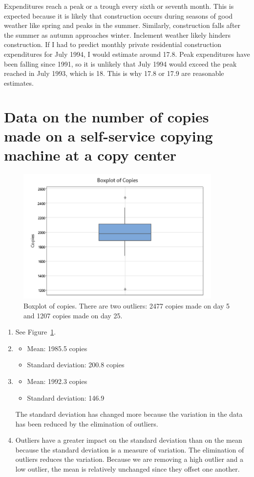 \documentclass[12pt]{article}
\begin{document}
Expenditures reach a peak or a trough every sixth or seventh month. This is expected because it is likely that construction occurs during seasons of good weather like spring and peaks in the summer. Similarly, construction falls after the summer as autumn approaches winter. Inclement weather likely hinders construction. If I had to predict monthly private residential construction expenditures for July 1994, I would estimate around 17.8. Peak expenditures have been falling since 1991, so it is unlikely that July 1994 would exceed the peak reached in July 1993, which is 18. This is why 17.8 or 17.9 are reasonable estimates. 

\section{Data on the number of copies made on a self-service copying machine at a copy center}
\begin{figure}
\begin{center}
\includegraphics[width=4in]{images/copies-boxplot.png}
\end{center}
\caption{Boxplot of copies. There are two outliers: 2477 copies made on day 5 and 1207 copies made on day 25.\label{fig:copiesboxplot}}
\end{figure}
\begin{enumerate}
\item See Figure~\ref{fig:copiesboxplot}.
\item
\begin{itemize}
    \item Mean: 1985.5 copies
    \item Standard deviation: 200.8 copies
\end{itemize}
\item
\begin{itemize}
    \item Mean: 1992.3 copies
    \item Standard deviation: 146.9
\end{itemize}
The standard deviation has changed more because the variation in the data has been reduced by the elimination of outliers.
\item Outliers have a greater impact on the standard deviation than on the mean because the standard deviation is a measure of variation. The elimination of outliers reduces the variation. Because we are removing a high outlier and a low outlier, the mean is relatively unchanged since they offset one another.
\end{enumerate}
\end{document}

